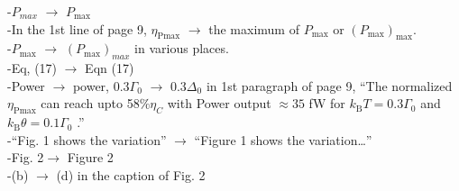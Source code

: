 \documentclass[aip,graphicx,preprint]{revtex4-1}
\begin{document}
-$P_{max}$ $\rightarrow$  $P_\text{max}$ \\
-In the 1st line of page 9,  $\eta_\text{Pmax}$ $\rightarrow$  the maximum of $P_\text{max}$ or $(P_\text{max})_\text{max}$.\\
-$P_\text{max}$ $\rightarrow$ $(P_\text{max})_{max}$ in various places.\\
-Eq, (17) $\rightarrow$  Eqn (17)\\
-Power $\rightarrow$ power, $0.3\Gamma_0$ $\rightarrow$ $0.3\Delta_0$ in 1st paragraph of page 9,  ``The normalized $\eta_\text{Pmax}$ can reach upto 58$\% \eta_C$ with Power output $\approx 35$ fW for $k_\text{B} T = 0.3\Gamma_ 0$ and $k_\text{B}\theta = 0.1\Gamma_0$ .''\\
-``Fig. 1 shows the variation'' $\rightarrow$  ``Figure 1 shows the variation…''\\
-Fig. 2$\rightarrow$  Figure 2\\
-(b) $\rightarrow$  (d) in the caption of Fig. 2\\














%
%
%

\end{document}
